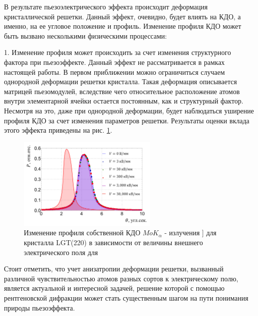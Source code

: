 В результате пьезоэлектрического эффекта происходит деформация
кристаллической решетки. Данный эффект, очевидно, будет влиять на
КДО, а именно, на ее угловое положение и профиль.
Изменение профиля КДО может быть вызвано несколькими физическими процессами:

1. Изменение профиля может происходить за счет изменения структурного фактора при
пьезоэффекте. Данный эффект не рассматривается в рамках настоящей работы.
В первом приближении можно ограничиться случаем однородной деформации решетки
 кристалла. Такая деформация описывается
 матрицей пьезомодулей, вследствие чего относительное расположение атомов
 внутри элементарной ячейки остается постоянным, как и структурный фактор.
 Несмотря на это, даже при однородной деформации, будет наблюдаться
 уширение профиля КДО за счет изменения параметров решетки. Результаты оценки
  вклада этого эффекта приведены на рис. \ref{ris:self_kdo_deformation}.

 \begin{figure}[H]
   \centering
   \includegraphics[width=0.6\textwidth]{images/self_kdo_under_ex_field.png}
   \caption{Изменение профиля собственной КДО $MoK_{\alpha}$ - излучения ]
   для кристалла LGT(220)
   в зависимости от величины внешнего электрического поля для }
   \label{ris:self_kdo_deformation}
 \end{figure}

Стоит отметить, что учет анизатропии деформации решетки, вызванный различной чувствительностью
атомов разных сортов к электрическому полю, является актуальной и интересной задачей,
решение которой с помощью рентгеновской дифракции может стать существенным шагом
на пути понимания природы пьезоэффекта.

